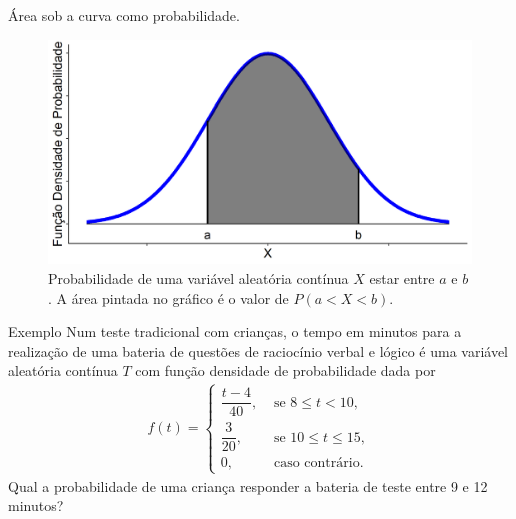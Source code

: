 \documentclass[9pt]{beamer}
\begin{document}
\begin{frame}{Área sob a curva como probabilidade.}
\begin{figure}
	\centering
	\includegraphics[width=12cm]{figure/probabilidade.png}
	\caption{Probabilidade de uma variável aleatória contínua $X$ estar entre $a$ e $b$. A área pintada no gráfico é o valor de $P(a < X < b)$.}
	\label{fig:area_prob}
\end{figure}

\end{frame}

\begin{frame}{Exemplo}
 Num teste tradicional com crianças, o tempo em minutos para a realização de uma bateria de questões de raciocínio verbal e lógico é uma variável aleatória contínua $T$ com função densidade de probabilidade
 dada por
 \begin{align*}
  f(t) =
  \begin{cases}
   \dfrac{t-4}{40}, & \mbox{ se } 8 \leq t < 10,\\
   \dfrac{3}{20}, & \mbox{ se } 10 \leq t \leq 15,\\
   0, & \mbox{ caso contrário}.
  \end{cases}
 \end{align*}
  Qual a probabilidade de uma criança responder a bateria de teste entre 9 e 12 minutos?
\end{frame}
\end{document}
